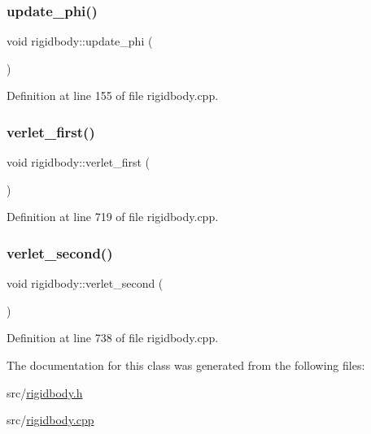 \subsubsection{\texorpdfstring{update\+\_\+phi()}{update\_phi()}}
{\footnotesize\ttfamily void rigidbody\+::update\+\_\+phi (\begin{DoxyParamCaption}{ }\end{DoxyParamCaption})}



Definition at line 155 of file rigidbody.\+cpp.

\mbox{\label{classrigidbody_afabb8a8ca32317fc8fdb534932e0de88}} 
\subsubsection{\texorpdfstring{verlet\+\_\+first()}{verlet\_first()}}
{\footnotesize\ttfamily void rigidbody\+::verlet\+\_\+first (\begin{DoxyParamCaption}{ }\end{DoxyParamCaption})}



Definition at line 719 of file rigidbody.\+cpp.

\mbox{\label{classrigidbody_a284a5d8bbc75fe6fd81217c6f861ae60}} 
\subsubsection{\texorpdfstring{verlet\+\_\+second()}{verlet\_second()}}
{\footnotesize\ttfamily void rigidbody\+::verlet\+\_\+second (\begin{DoxyParamCaption}{ }\end{DoxyParamCaption})}



Definition at line 738 of file rigidbody.\+cpp.



The documentation for this class was generated from the following files\+:\begin{DoxyCompactItemize}
\item 
src/\mbox{\hyperlink{rigidbody_8h}{rigidbody.\+h}}\item 
src/\mbox{\hyperlink{rigidbody_8cpp}{rigidbody.\+cpp}}\end{DoxyCompactItemize}
